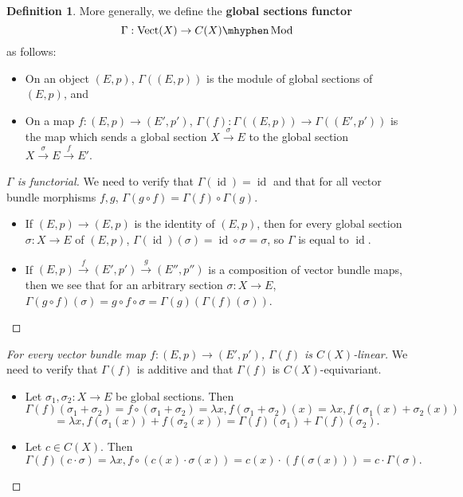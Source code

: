 \documentclass[11pt]{article}
\newcommand{\Vect}{\operatorname{Vect}}
\newcommand{\Mod}{\mhyphen\operatorname{Mod}}
\newcommand{\id}{\operatorname{id}}
\theoremstyle{plain}
\theoremstyle{definition}
\newtheorem{definition}{Definition}[section]
\begin{document}
\begin{definition}\label{def:global-sections-functor}
  More generally, we define the \textbf{global sections functor}
  \[\Gamma : \Vect(X) \to C(X)\Mod\]
  as follows:
  \begin{itemize}
  \item On an object \((E,p)\), \(\Gamma((E,p))\) is the module of global sections of \((E,p)\), and
    \item On a map \(f : (E,p) \to (E',p')\), \(\Gamma(f) : \Gamma((E,p)) \to \Gamma((E',p'))\) is the map which sends a global section \(X \overset{\sigma}{\to} E\) to the global section \(X \overset{\sigma}{\to} E \overset{f}{\to} E'\).
    \end{itemize}

    \begin{proof}[\(\Gamma\) is functorial]
      We need to verify that \(\Gamma(\id) = \id\) and that for all vector bundle morphisms \(f,g\), \(\Gamma(g \circ f) = \Gamma(f) \circ \Gamma(g)\).
      \begin{itemize}
      \item If \((E,p) \to (E,p)\) is the identity of \((E,p)\), then for every global section \(\sigma : X \to E\) of \((E,p)\), \(\Gamma(\id)(\sigma) = \id \circ \sigma = \sigma\), so \(\Gamma\) is equal to \(\id\).

        \item If \((E,p) \overset{f}{\to} (E',p') \overset{g}{\to} (E'', p'')\) is a composition of vector bundle maps, then we see that for an arbitrary section \(\sigma : X \to E\), \(\Gamma(g \circ f)(\sigma) = g \circ f \circ \sigma = \Gamma(g)(\Gamma(f)(\sigma))\).
      \end{itemize}
    \end{proof}

    \begin{proof}[For every vector bundle map \(f : (E,p) \to (E',p')\), \(\Gamma(f)\) is \(C(X)\)-linear]
      We need to verify that \(\Gamma(f)\) is additive and that \(\Gamma(f)\) is \(C(X)\)-equivariant.
      \begin{itemize}
      \item Let \(\sigma_1, \sigma_2 : X \to E\) be global sections. Then
        \[\Gamma(f)(\sigma_1 + \sigma_2) = f \circ (\sigma_1 + \sigma_2) = \lambda x, f(\sigma_1 + \sigma_2)(x) = \lambda x, f(\sigma_1(x) + \sigma_2(x))\]\[ = \lambda x, f(\sigma_1(x)) + f(\sigma_2(x)) = \Gamma(f)(\sigma_1) + \Gamma(f)(\sigma_2).\]
        \item Let \(c \in C(X)\). Then \[\Gamma(f)(c \cdot \sigma) = \lambda x, f \circ (c(x) \cdot \sigma(x)) = c(x) \cdot (f(\sigma(x))) = c \cdot \Gamma(\sigma).\]
      \end{itemize}
    \end{proof}

\end{definition}
\end{document}
